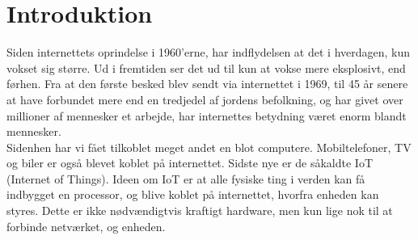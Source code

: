 \newpage
\section{Introduktion}
    Siden internettets oprindelse i 1960’erne, har indflydelsen at det i hverdagen, kun vokset sig større. Ud i fremtiden ser det ud til kun at vokse mere eksplosivt, end førhen. Fra at den første besked blev sendt via internettet i 1969, til 45 år senere at have forbundet mere end en tredjedel af jordens befolkning, og har givet over millioner af mennesker et arbejde, har internettes betydning været enorm blandt mennesker.\\
    Sidenhen har vi fået tilkoblet meget andet en blot computere. Mobiltelefoner, TV og biler er også blevet koblet på internettet. Sidste nye er de såkaldte IoT (Internet of Things). Ideen om IoT er at alle fysiske ting i verden kan få indbygget en processor, og blive koblet på internettet, hvorfra enheden kan styres. Dette er ikke nødvændigtvis kraftigt hardware, men kun lige nok til at forbinde netværket, og enheden.


\newpage